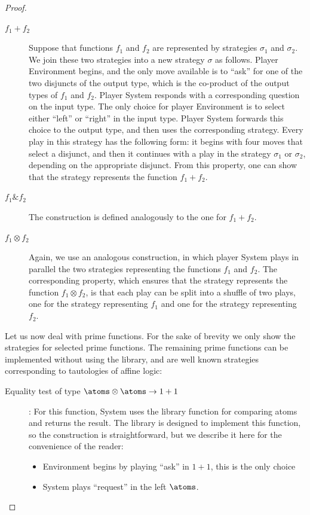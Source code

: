 \begin{proof}
\begin{description}
        \item[$f_1 + f_2$] Suppose that functions $f_1$ and $f_2$ are represented by strategies $\sigma_1$ and $\sigma_2$. We join these two strategies into a new strategy $\sigma$ as follows.  Player Environment begins, and the only move available is to ``ask'' for one of the two disjuncts of the output type, which is the co-product of the output types of $f_1$ and $f_2$. Player System responds with a corresponding question on the input type. The only choice for player Environment is to select either ``left'' or ``right'' in the input type. Player System forwards this choice to the output type, and then uses the corresponding strategy.  Every play in this strategy has the following form: it begins with four moves that select a disjunct, and then it continues with a play in the strategy $\sigma_1$ or $\sigma_2$, depending on  the appropriate disjunct. From this property, one can show that the strategy represents the function $f_1 + f_2$.
        \item[$f_1 \& f_2$]  The construction is defined analogously to the one for $f_1 + f_2$.
        \item[$f_1 \otimes f_2$] Again, we use an analogous construction, in which player System plays in parallel the two strategies representing the functions $f_1$ and $f_2$. The corresponding property, which ensures that the strategy represents the function $f_1 \otimes f_2$, is that each play can be split into a shuffle of two plays, one for the strategy representing $f_1$ and one for the strategy representing $f_2$.
    \end{description}
    Let us now deal with prime functions. For the sake of brevity we only show the strategies for selected prime functions. The remaining prime functions can be implemented without using  the library, and are well known strategies corresponding to tautologies of affine logic:
    \begin{description}
        \item[Equality test of type $\atoms \otimes \atoms \to 1 + 1$]:
        For this function, System uses the library function for comparing atoms 
        and returns the result. The library is designed to implement this function, so the construction is straightforward, but we describe it here for the convenience of the reader:
\begin{itemize}
    \item Environment begins by  playing ``ask'' in $1+1$, this is the only choice
    \item System  plays  ``request'' in the left $\atoms$.

\end{itemize}
\end{description}
\end{proof}

